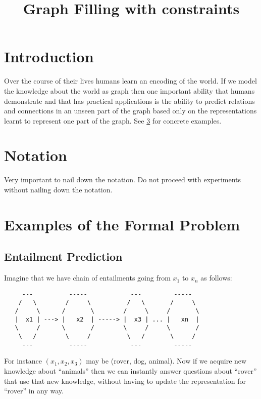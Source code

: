 \documentclass[11pt]{article}
\title{Graph Filling with constraints}
\begin{document}
\maketitle
\section{Introduction}
\label{sec:introduction} Over the course of their lives humans learn
an encoding of the world.  If we model the knowledge about the world
as graph then one important ability that humans demonstrate and that
has practical applications is the ability to predict relations and
connections in an unseen part of the graph based only on the
representations learnt to represent one part of the graph. See
\ref{sec:exampl-form-probl} for concrete examples.

\section{Notation}
\label{sec:notation} {\huge Very important to nail down the
notation. Do not proceed with experiments without nailing down the
notation.}

\section{Examples of the Formal Problem}
\label{sec:exampl-form-probl}


\subsection{Entailment Prediction}
\label{subsec:entailment}
Imagine that we have chain of entailments going from $x_1$ to $x_n$ as follows:

\begin{verbatim}
     ---          -----            ---         -----
    /   \        /     \          /   \       /     \
   /     \      /       \        /     \     /       \
   |  x1 | ---> |   x2  | -----> |  x3 | ... |   xn  |
   \     /      \       /        \     /     \       /
    \   /        \     /          \   /       \     /
     ---          -----            ---         -----
\end{verbatim}

For instance $(x_1, x_2, x_3)$ may be (rover, dog, animal). Now if we
acquire new knowledge about ``animals'' then we can instantly answer
questions about ``rover'' that use that new knowledge, without having
to update the representation for ``rover'' in any way.
\end{document}
